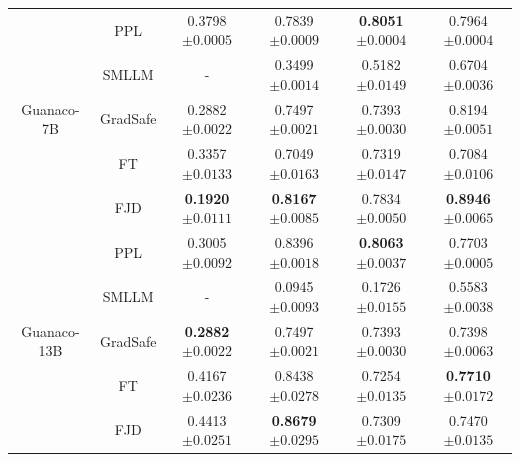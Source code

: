 \documentclass{article}
\begin{document}
\begin{table}[t]
\begin{tabular}{cccccc}
    \midrule
    \multirow{5}{*}{Guanaco-7B} 
    & PPL & 0.3798\tiny{$\pm 0.0005$} & 0.7839\tiny{$\pm 0.0009$} & \textbf{0.8051}\tiny{$\pm 0.0004$} & 0.7964\tiny{$\pm 0.0004$}  \\
    & SMLLM & - & 0.3499\tiny{$\pm 0.0014$} & 0.5182\tiny{$\pm 0.0149$} & 0.6704\tiny{$\pm 0.0036$}   \\
    & GradSafe & 0.2882\tiny{$\pm 0.0022$} & 0.7497\tiny{$\pm 0.0021$} & 0.7393\tiny{$\pm 0.0030$} & 0.8194\tiny{$\pm 0.0051$}   \\
    & FT & 0.3357\tiny{$\pm 0.0133$} & 0.7049\tiny{$\pm 0.0163$} & 0.7319\tiny{$\pm 0.0147$} & 0.7084\tiny{$\pm 0.0106$}    \\
    & FJD & \textbf{0.1920}\tiny{$\pm 0.0111$} & \textbf{0.8167}\tiny{$\pm 0.0085$} & 0.7834\tiny{$\pm 0.0050$} & \textbf{0.8946}\tiny{$\pm 0.0065$}   \\
    \midrule
    \multirow{5}{*}{Guanaco-13B} 
    & PPL & 0.3005\tiny{$\pm 0.0092$} & 0.8396\tiny{$\pm 0.0018$} & \textbf{0.8063}\tiny{$\pm 0.0037$} & 0.7703\tiny{$\pm 0.0005$}    \\
    & SMLLM & - & 0.0945\tiny{$\pm 0.0093$} & 0.1726\tiny{$\pm 0.0155$} & 0.5583\tiny{$\pm 0.0038$}   \\
    & GradSafe & \textbf{0.2882}\tiny{$\pm 0.0022$} & 0.7497\tiny{$\pm 0.0021$} & 0.7393\tiny{$\pm 0.0030$} & 0.7398\tiny{$\pm 0.0063$}   \\
    & FT & 0.4167\tiny{$\pm 0.0236$} & 0.8438\tiny{$\pm 0.0278$} & 0.7254\tiny{$\pm 0.0135$} & \textbf{0.7710}\tiny{$\pm 0.0172$}   \\
    & FJD & 0.4413\tiny{$\pm 0.0251$} & \textbf{0.8679}\tiny{$\pm 0.0295$} & 0.7309\tiny{$\pm 0.0175$} & 0.7470\tiny{$\pm 0.0135$}   \\
    
    \bottomrule
  \end{tabular} 

\end{table}
\end{document}
